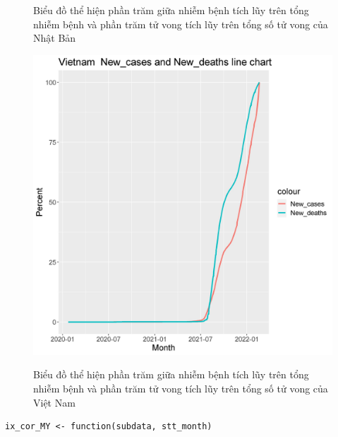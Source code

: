 \documentclass[a4paper]{article}
\theoremstyle{definition}
\begin{document}
\begin{enumerate}[i)]
\begin{enumerate}[1)]
\begin{figure}[h!]
            \label{fig:my_label}
        \end{figure}
        \begin{figure}[h!]
            \begin{center}
            \caption{Biểu đồ thể hiện phần trăm giữa nhiễm bệnh tích lũy trên tổng nhiễm bệnh và phần trăm tử vong tích lũy trên tổng số tử vong của Nhật Bản}
	        \end{center}
        \end{figure}
        \newpage
        \begin{figure}[h!]
            \centering
            \includegraphics[scale = 0.8]{Images/IX/ix1Vietnam.jpeg}
            \label{fig:my_label}
        \end{figure}
        \begin{figure}[h!]
            \begin{center}
            \caption{Biểu đồ thể hiện phần trăm giữa nhiễm bệnh tích lũy trên tổng nhiễm bệnh và phần trăm tử vong tích lũy trên tổng số tử vong của Việt Nam}
	        \end{center}
        \end{figure}
\newpage
        \lstset{
    title=Function and Prep for ix 2-3}
\begin{lstlisting}[frame=single]  
ix_cor_MY <- function(subdata, stt_month)

\end{lstlisting}
\end{enumerate}
\end{enumerate}
\end{document}
